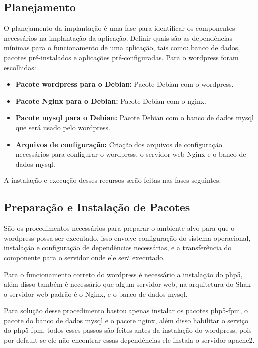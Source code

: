 \subsection{Planejamento}

O planejamento da implantação é uma fase para identificar os componentes
necessários na implantação da aplicação. Definir quais são as dependências mínimas
para o funcionamento de uma aplicação, tais como: banco de dados, pacotes
pré-instalados e aplicações pré-configuradas. Para o wordpress foram escolhidas:

\begin{itemize}
   \item \textbf{Pacote wordpress para o Debian:} Pacote Debian com o wordpress.
   \item \textbf{Pacote Nginx para o Debian:} Pacote Debian com o nginx.
   \item \textbf{Pacote mysql para o Debian:} Pacote Debian com o banco de dados mysql
   que será usado pelo wordpress.
   \item \textbf{Arquivos de configuração:} Criação dos arquivos de configuração
   necessários para configurar o wordpress, o servidor web Nginx e o banco de dados
   mysql.
\end{itemize}

A instalação e execução desses recursos serão feitas nas fases seguintes.

\subsection{Preparação e Instalação de Pacotes}
\label{wordpress:preparacao}

São os procedimentos necessários para preparar o ambiente alvo para que o wordpress
possa ser executado, isso envolve configuração do sistema operacional, instalação
e configuração de dependências necessárias, e a transferência do componente
para o servidor onde ele será executado.

Para o funcionamento correto do wordpress é necessário a instalação do php5, além
disso também é necessário que algum servidor web, na arquitetura do Shak o servidor
web padrão é o Nginx, e o banco de dados mysql.

Para solução desse procedimento bastou apenas instalar os pacotes php5-fpm, o pacote
do banco de dados mysql e o pacote nginx, além disso habilitar o serviço do
php5-fpm, todos esses passos são feitos antes da instalação do wordpress,
pois por default se ele não encontrar essas dependências ele instala o servidor
apache2.

